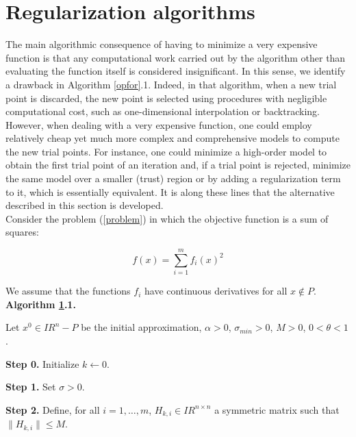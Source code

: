 \documentclass{article}
\newcommand{\R}         {I\!\!R}
\begin{document}
\section{Regularization algorithms} \label{complexity}

The main algorithmic consequence of having to minimize a very expensive function is that any computational work carried out by the algorithm
 other than evaluating the function itself is considered insignificant. In this sense, we identify a drawback in Algorithm \ref{opfor}.1. Indeed,
 in that algorithm, when a new trial point is discarded, the new point is selected using procedures with negligible computational cost, 
such as one-dimensional interpolation or backtracking. However, when dealing with a very expensive function, one could employ relatively 
cheap yet much more complex and comprehensive models to compute the new trial points. For instance, one could minimize a high-order
 model to obtain the first trial point of an iteration and, if a trial point is rejected, minimize the same model over a smaller 
 (trust) region or by adding a regularization term to it, which is essentially equivalent. It is along these lines that the alternative
 described in this section is developed.\\

Consider the problem (\ref{problem}) in which the objective function is a sum of squares:

\begin{equation} \label{lasoma}
f(x) =  \sum_{i=1}^m f_i(x)^2
\end{equation}

We assume that the functions $f_i$ have continuous derivatives for all $x \notin P$. \\

 
  \noindent
{\bf Algorithm \ref{complexity}.1.}

Let $x^0 \in \R^n - P$ be the initial 
 approximation, $\alpha > 0$,  $\sigma_{min} > 0$, $M > 0$, $0 < \theta < 1$.

\noindent
{\bf Step 0.} Initialize $k \leftarrow 0$. 

\noindent
{\bf Step 1.} Set $\sigma > 0$.


\noindent
{\bf Step 2.} Define, for all $i = 1, \dots, m$, $H_{k,i} \in \R^{n \times n}$ a symmetric matrix such that 
  $\|H_{k,i}\| \leq M$. 
\end{document}
